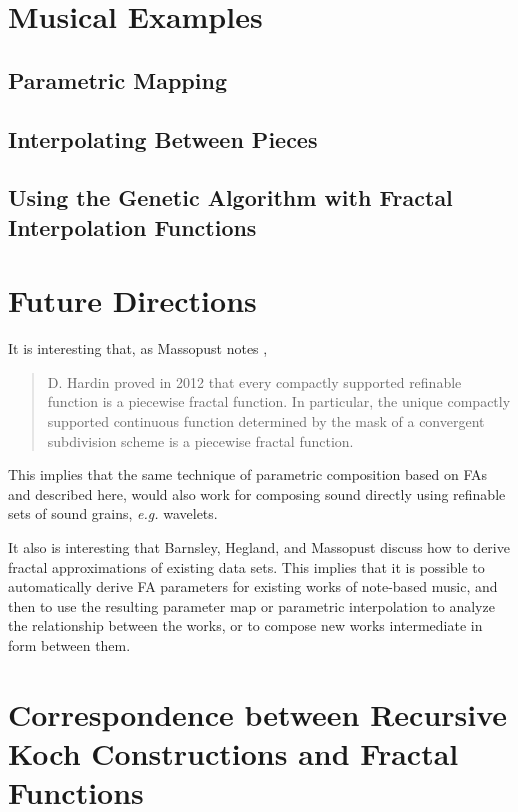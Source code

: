 \documentclass[english,11pt,letterpaper,onecolumn]{scrartcl}
\numberwithin{equation}{section}
\begin{document}
\section{Musical Examples}

\subsection{Parametric Mapping}


\subsection{Interpolating Between Pieces}


\subsection{Using the Genetic Algorithm with Fractal Interpolation
Functions}

\section{Future Directions}

It is interesting that, as Massopust notes \cite{massopust2017},
\begin{quote}D. Hardin proved in 2012 that every compactly supported
refinable function is a piecewise fractal function. In particular, the
unique
compactly supported continuous function determined by the mask of a
convergent
subdivision scheme is a piecewise fractal function. \end{quote}
This implies that the same technique of parametric
composition based on FAs and described here, would also work for composing
sound directly using refinable sets of sound grains, \textit{e.g.}
wavelets.

It also is interesting that Barnsley, Hegland, and Massopust
\cite{2013arXiv1309.0972B} discuss how to derive fractal approximations of
existing data sets. This implies that it is possible to automatically derive FA
parameters for existing works of note-based music, and then to use the resulting
parameter map or parametric interpolation to analyze the relationship between
the works, or to compose new works intermediate in form between them.

\section{Correspondence between Recursive Koch Constructions and Fractal Functions}
\end{document}

